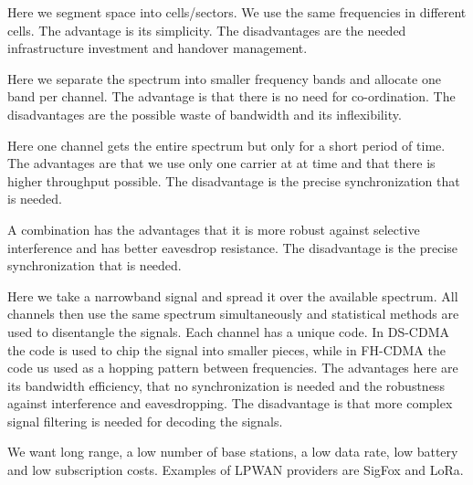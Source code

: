\begin{mysubtitle} Here we segment space into cells/sectors. We use the same frequencies in different cells. The advantage is its simplicity. The disadvantages are the needed infrastructure investment and handover management.
\end{mysubtitle}
\begin{mysubtitle} Here we separate the spectrum into smaller frequency bands and allocate one band per channel. The advantage is that there is no need for co-ordination. The disadvantages are the possible waste of bandwidth and its inflexibility.
\end{mysubtitle}
\begin{mysubtitle} Here one channel gets the entire spectrum but only for a short period of time. The advantages are that we use only one carrier at at time and that there is higher throughput possible. The disadvantage is the precise synchronization that is needed.
\end{mysubtitle}
\begin{mysubtitle} A combination has the advantages that it is more robust against selective interference and has better eavesdrop resistance. The disadvantage is the precise synchronization that is needed.
\end{mysubtitle}
\begin{mytitle} Here we take a narrowband signal and spread it over the available spectrum. All channels then use the same spectrum simultaneously and statistical methods are used to disentangle the signals. Each channel has a unique code. In DS-CDMA the code is used to chip the signal into smaller pieces, while in FH-CDMA the code us used as a hopping pattern between frequencies. The advantages here are its bandwidth efficiency, that no synchronization is needed and the robustness against interference and eavesdropping. The disadvantage is that more complex signal filtering is needed for decoding the signals.
\end{mytitle}
\begin{mytitle} We want long range, a low number of base stations, a low data rate, low battery and low subscription costs. Examples of LPWAN providers are SigFox and LoRa.
\end{mytitle}

